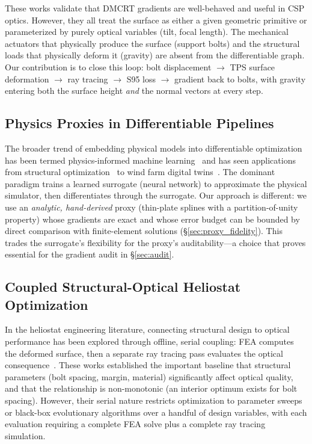 \documentclass{CVM}
\begin{document}
These works validate that DMCRT gradients are well-behaved and useful in CSP
optics. However, they all treat the surface as either a given geometric
primitive or parameterized by purely optical variables (tilt, focal length).
The mechanical actuators that physically produce the surface (support bolts)
and the structural loads that physically deform it (gravity) are absent from
the differentiable graph. Our contribution is to close this loop: bolt
displacement $\rightarrow$ TPS surface deformation $\rightarrow$ ray tracing
$\rightarrow$ S95 loss $\rightarrow$ gradient back to bolts, with gravity
entering both the surface height \emph{and} the normal vectors at every step.

\subsection{Physics Proxies in Differentiable Pipelines}

The broader trend of embedding physical models into differentiable optimization
has been termed physics-informed machine learning~\cite{karniadakis2021} and has
seen applications from structural optimization~\cite{diffopt2024} to wind farm
digital twins~\cite{ecmwind2023}. The dominant paradigm trains a learned
surrogate (neural network) to approximate the physical simulator, then
differentiates through the surrogate. Our approach is different: we use an
\emph{analytic, hand-derived} proxy (thin-plate splines with a partition-of-unity
property) whose gradients are exact and whose error budget can be bounded by
direct comparison with finite-element solutions (\S\ref{sec:proxy_fidelity}).
This trades the surrogate's flexibility for the proxy's auditability---a choice
that proves essential for the gradient audit in \S\ref{sec:audit}.

\subsection{Coupled Structural-Optical Heliostat Optimization}

In the heliostat engineering literature, connecting structural design to optical
performance has been explored through offline, serial coupling: FEA computes
the deformed surface, then a separate ray tracing pass evaluates the optical
consequence~\cite{yan2024,yan2025,yang2022,thalange2017}. These works
established the important baseline that structural parameters (bolt spacing,
margin, material) significantly affect optical quality, and that the
relationship is non-monotonic (an interior optimum exists for bolt spacing).
However, their serial nature restricts optimization to parameter sweeps or
black-box evolutionary algorithms over a handful of design variables, with each
evaluation requiring a complete FEA solve plus a complete ray tracing
simulation.
\end{document}
